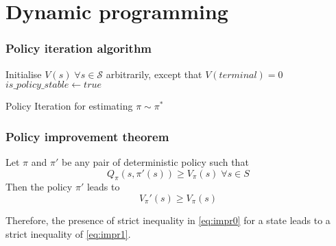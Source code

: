 \section{Dynamic programming} \label{policyimprovement}

\subsubsection{Policy iteration algorithm}

\begin{algorithm}[!htp]
	\SetAlgoLined
	\DontPrintSemicolon
	\LinesNumbered
	Initialise $V(s) \; \forall s \in \mathcal{S}$ arbitrarily, except that $V(terminal) = 0$\;
	$is\_policy\_stable \leftarrow true$\;
	\caption{Policy Iteration for estimating $\pi \sim \pi^*$}
	\label{policy_evaluation}
\end{algorithm}

\subsubsection{Policy improvement theorem}

Let $\pi$ and $\pi'$ be any pair of deterministic policy such that 
\begin{equation} \label{eq:impr0}
	Q_\pi(s, \pi'(s)) \ge V_\pi(s) \; \forall s \in S
\end{equation}
Then the policy $\pi'$ leads to
\begin{equation} \label{eq:impr1}
V_\pi'(s) \ge V_\pi(s)
\end{equation}


Therefore, the presence of strict inequality in \vref{eq:impr0} for a state leads to a strict inequality of \vref{eq:impr1}.

